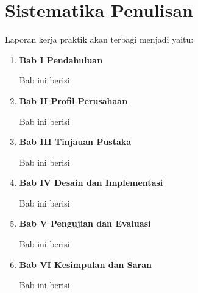 \section{Sistematika Penulisan}

Laporan kerja praktik akan terbagi menjadi \lipsum[9][1] yaitu:

\begin{enumerate}[nolistsep]

  \item \textbf{Bab I Pendahuluan}

  Bab ini berisi \lipsum[9][2-4]

  \item \textbf{Bab II Profil Perusahaan}

  Bab ini berisi \lipsum[9][5-7]

  \item \textbf{Bab III Tinjauan Pustaka}

  Bab ini berisi \lipsum[9][8]

  \item \textbf{Bab IV Desain dan Implementasi}

  Bab ini berisi \lipsum[10][1-2]

  \item \textbf{Bab V Pengujian dan Evaluasi}

  Bab ini berisi \lipsum[10][3-4]

  \item \textbf{Bab VI Kesimpulan dan Saran}

  Bab ini berisi \lipsum[10][5-8]

\end{enumerate}

